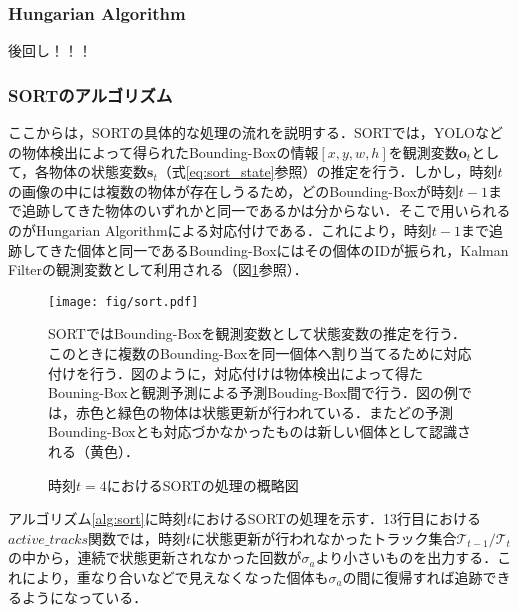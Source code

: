         \subsubsection{Hungarian Algorithm}
        後回し！！！

        \subsubsection{SORTのアルゴリズム}
        ここからは，SORTの具体的な処理の流れを説明する．SORTでは，YOLOなどの物体検出によって得られたBounding-Boxの情報$\left[x, y, w, h\right]$を観測変数$\bm{o}_t$として，各物体の状態変数$\bm{s}_t$（式\ref{eq:sort_state}参照）の推定を行う．しかし，時刻$t$の画像の中には複数の物体が存在しうるため，どのBounding-Boxが時刻$t-1$まで追跡してきた物体のいずれかと同一であるかは分からない．そこで用いられるのがHungarian Algorithmによる対応付けである．これにより，時刻$t-1$まで追跡してきた個体と同一であるBounding-Boxにはその個体のIDが振られ，Kalman Filterの観測変数として利用される（図\ref{fig:sort}参照）．

        \begin{figure}[t]
            \centering
            \texttt{[image: fig/sort.pdf]}
            \caption{時刻$t=4$におけるSORTの処理の概略図}
            \small
            SORTではBounding-Boxを観測変数として状態変数の推定を行う．このときに複数のBounding-Boxを同一個体へ割り当てるために対応付けを行う．図のように，対応付けは物体検出によって得たBouning-Boxと観測予測による予測Bouding-Box間で行う．図の例では，赤色と緑色の物体は状態更新が行われている．またどの予測Bounding-Boxとも対応づかなかったものは新しい個体として認識される（黄色）．
            \label{fig:sort}
        \end{figure}

        アルゴリズム\ref{alg:sort}に時刻$t$におけるSORTの処理を示す．13行目における$active\_tracks$関数では，時刻$t$に状態更新が行われなかったトラック集合$\mathcal{T}_{t-1}/\mathcal{T}_t$の中から，連続で状態更新されなかった回数が$\sigma_a$より小さいものを出力する．これにより，重なり合いなどで見えなくなった個体も$\sigma_a$の間に復帰すれば追跡できるようになっている．

